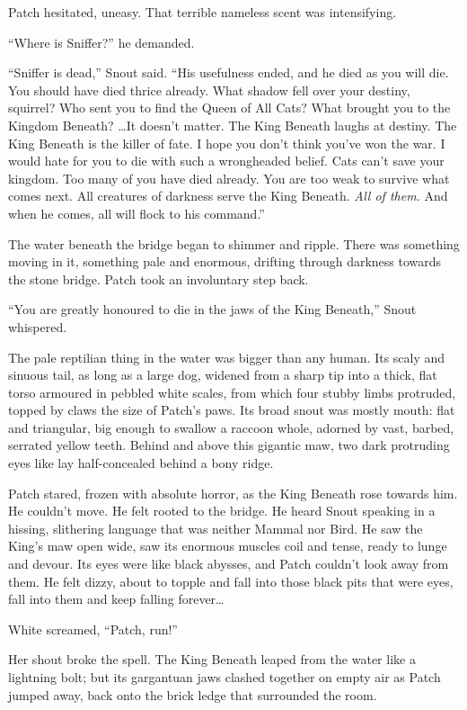 \documentclass[ebook,oneside,openany,12pt]{memoir}
\begin{document}
Patch hesitated, uneasy. That terrible nameless scent was
intensifying.

“Where is Sniffer?” he demanded.

“Sniffer is dead,” Snout said. “His usefulness ended, and he died as
you will die. You should have died thrice already. What shadow fell
over your destiny, squirrel? Who sent you to find the Queen of All
Cats? What brought you to the Kingdom Beneath? …It doesn’t matter. The
King Beneath laughs at destiny. The King Beneath is the killer of
fate. I hope you don’t think you’ve won the war. I would hate for you
to die with such a wrongheaded belief. Cats can’t save your
kingdom. Too many of you have died already. You are too weak to
survive what comes next. All creatures of darkness serve the King
Beneath. \emph{All of them.} And when he comes, all will flock to
his command.”

The water beneath the bridge began to shimmer and ripple. There was
something moving in it, something pale and enormous, drifting through
darkness towards the stone bridge. Patch took an involuntary step
back.

“You are greatly honoured to die in the jaws of the King Beneath,”
Snout whispered.

The pale reptilian thing in the water was bigger than any human. Its
scaly and sinuous tail, as long as a large dog, widened from a sharp
tip into a thick, flat torso armoured in pebbled white scales, from
which four stubby limbs protruded, topped by claws the size of Patch’s
paws. Its broad snout was mostly mouth: flat and triangular, big
enough to swallow a raccoon whole, adorned by vast, barbed, serrated
yellow teeth. Behind and above this gigantic maw, two dark protruding
eyes like lay half-concealed behind a bony ridge.

Patch stared, frozen with absolute horror, as the King Beneath rose
towards him. He couldn’t move. He felt rooted to the bridge. He heard
Snout speaking in a hissing, slithering language that was neither
Mammal nor Bird. He saw the King’s maw open wide, saw its enormous
muscles coil and tense, ready to lunge and devour. Its eyes were like
black abysses, and Patch couldn’t look away from them. He felt dizzy,
about to topple and fall into those black pits that were eyes, fall
into them and keep falling forever…

White screamed, “Patch, run!”

Her shout broke the spell. The King Beneath leaped from the water like
a lightning bolt; but its gargantuan jaws clashed together on empty
air as Patch jumped away, back onto the brick ledge that surrounded
the room.
\end{document}
